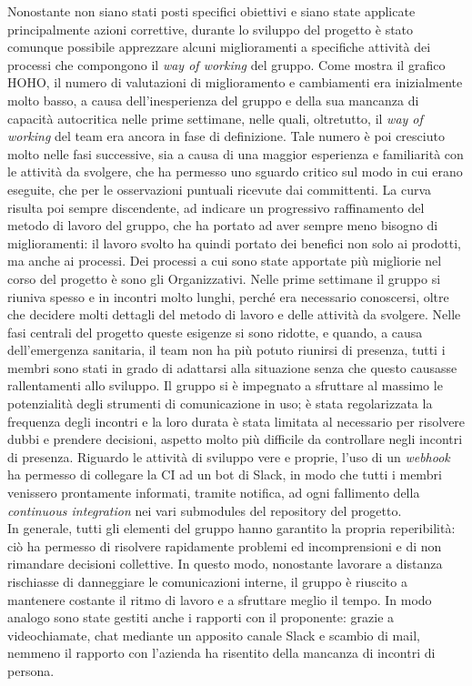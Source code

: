 	\newline\newline
	Nonostante non siano stati posti specifici obiettivi e siano state applicate principalmente azioni correttive, durante lo sviluppo del progetto è stato comunque possibile apprezzare alcuni miglioramenti a specifiche attività dei processi che compongono il \textit{way of working} del gruppo. Come mostra il grafico HOHO, il numero di valutazioni di miglioramento e cambiamenti era inizialmente molto basso, a causa dell'inesperienza del gruppo e della sua mancanza di capacità autocritica nelle prime settimane, nelle quali, oltretutto, il \textit{way of working} del team era ancora in fase di definizione. Tale numero è poi cresciuto molto nelle fasi successive, sia a causa di una maggior esperienza e familiarità con le attività da svolgere, che ha permesso uno sguardo critico sul modo in cui erano eseguite, che per le osservazioni puntuali ricevute dai committenti. La curva risulta poi sempre discendente, ad indicare un progressivo raffinamento del metodo di lavoro del gruppo, che ha portato ad aver sempre meno bisogno di miglioramenti: il lavoro svolto ha quindi portato dei benefici non solo ai prodotti, ma anche ai processi.
	\newline\newline
	Dei processi a cui sono state apportate più migliorie nel corso del progetto è sono gli Organizzativi. Nelle prime settimane il gruppo si riuniva spesso e in incontri molto lunghi, perché era necessario conoscersi, oltre che decidere molti dettagli del metodo di lavoro e delle attività da svolgere. Nelle fasi centrali del progetto queste esigenze si sono ridotte, e quando, a causa dell'emergenza sanitaria, il team non ha più potuto riunirsi di presenza, tutti i membri sono stati in grado di adattarsi alla situazione senza che questo causasse rallentamenti allo sviluppo. Il gruppo si è impegnato a sfruttare al massimo le potenzialità degli strumenti di comunicazione in uso; è stata regolarizzata la frequenza degli incontri e la loro durata è stata limitata al necessario per risolvere dubbi e prendere decisioni, aspetto molto più difficile da controllare negli incontri di presenza. Riguardo le attività di sviluppo  vere e proprie, l'uso di un \textit{webhook} ha permesso di collegare la CI ad un bot di Slack, in modo che tutti i membri venissero prontamente informati, tramite notifica, ad ogni fallimento della \textit{continuous integration} nei vari submodules del repository del progetto. 
	\\In generale, tutti gli elementi del gruppo hanno garantito la propria reperibilità: ciò ha permesso di risolvere rapidamente problemi ed incomprensioni e di non rimandare decisioni collettive. In questo modo, nonostante lavorare a distanza rischiasse di danneggiare le comunicazioni interne, il gruppo è riuscito a mantenere costante il ritmo di lavoro e a sfruttare meglio il tempo. In modo analogo sono state gestiti anche i rapporti con il proponente: grazie a videochiamate, chat mediante un apposito canale Slack e scambio di mail, nemmeno il rapporto con l'azienda ha risentito della mancanza di incontri di persona.
